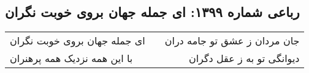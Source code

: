 \begin{center}
\section*{رباعی شماره ۱۳۹۹: ای جمله جهان بروی خوبت نگران}
\label{sec:1399}
\begin{longtable}{l p{0.5cm} r}
ای جمله جهان بروی خوبت نگران
&&
جان مردان ز عشق تو جامه دران
\\
با این همه نزدیک همه پرهنران
&&
دیوانگی تو به ز عقل دگران
\\
\end{longtable}
\end{center}
